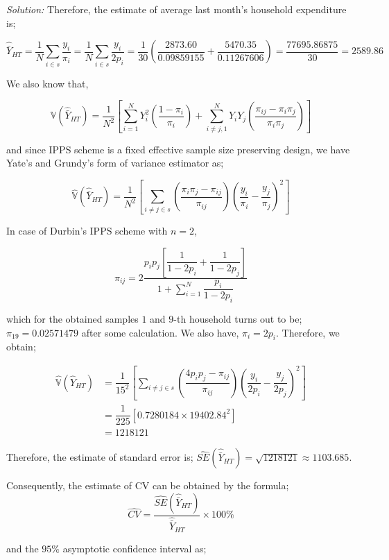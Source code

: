 \documentclass[12pt]{article}
\newcommand{\Var}{\mathbb{V}}
\theoremstyle{definition}
\newenvironment{answer}{\textit{Solution: }\quad }{ \hfill \qedsymbol}
\begin{document}
\begin{answer}
	Therefore, the estimate of average last month's household expenditure is;

	$$\widehat{\bar{Y}}_{HT} 
	= \dfrac{1}{N} \sum_{i \in s} \dfrac{y_i}{\pi_i} 
	= \dfrac{1}{N} \sum_{i \in s} \dfrac{y_i}{2p_i}
	= \dfrac{1}{30} \left( \dfrac{2873.60}{0.09859155} + \dfrac{5470.35}{0.11267606} \right)
	= \dfrac{77695.86875}{30}
	= 2589.86
	$$

	We also know that,

	$$\Var(\widehat{\bar{Y}}_{HT}) = \dfrac{1}{N^2}\left[\sum_{i=1}^{N} Y_i^2 \left( \dfrac{1 - \pi_i}{\pi_i} \right) + \sum_{i \neq j, 1}^{N} Y_iY_j\left( \dfrac{\pi_{ij} - \pi_i \pi_j}{\pi_i \pi_j} \right)\right]$$

	and since IPPS scheme is a fixed effective sample size preserving design, we have Yate's and Grundy's form of variance estimator as;

	$$\widehat{\Var}(\widehat{\bar{Y}}_{HT}) = \dfrac{1}{N^2} \left[\sum_{i\neq j \in s} \left( \dfrac{\pi_i \pi_j - \pi_{ij}}{\pi_{ij}} \right) \left( \dfrac{y_i}{\pi_i} - \dfrac{y_j}{\pi_j} \right)^2\right]$$

	In case of Durbin's IPPS scheme with $n = 2$, 

	$$\pi_{ij} = 2 \dfrac{p_i p_j \left[ \dfrac{1}{1 - 2p_i}  + \dfrac{1}{1 - 2p_j} \right]}{1 + \sum_{i=1}^{N} \dfrac{p_i}{1 - 2p_i} }$$

	which for the obtained samples $1$ and $9$-th household turns out to be; $\pi_{19} = 0.02571479$ after some calculation. We also have, $\pi_i = 2p_i$. Therefore, we obtain;

	\begin{align*}
		\widehat{\Var}(\widehat{Y}_{HT})
		& = \dfrac{1}{15^2} \left[\sum_{i\neq j \in s} \left( \dfrac{4p_i p_j - \pi_{ij}}{\pi_{ij}} \right) \left( \dfrac{y_i}{2p_i} - \dfrac{y_j}{2p_j} \right)^2 \right]\\
		& = \dfrac{1}{225} \left[ 0.7280184 \times 19402.84^2 \right]\\
		& = 1218121
	\end{align*}

	Therefore, the estimate of standard error is; $\widehat{SE}(\widehat{\bar{Y}}_{HT}) = \sqrt{1218121} \approx 1103.685$.

	Consequently, the estimate of CV can be obtained by the formula;
	$$\widehat{CV} = \dfrac{\widehat{SE}(\widehat{\bar{Y}}_{HT})}{\widehat{\bar{Y}}_{HT}} \times 100\% $$

	and the $95\%$ asymptotic confidence interval as;


\end{answer}
\end{document}

